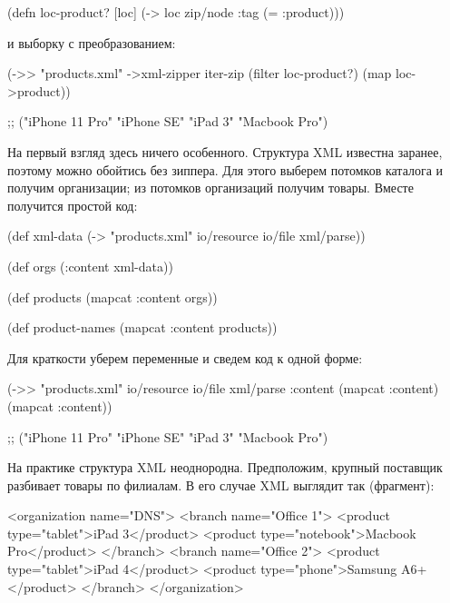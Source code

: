 \begin{english}
  \begin{clojure}
(defn loc-product? [loc]
  (-> loc zip/node :tag (= :product)))
  \end{clojure}
\end{english}

и выборку с преобразованием:

\begin{english}
  \begin{clojure}
(->> "products.xml"
     ->xml-zipper
     iter-zip
     (filter loc-product?)
     (map loc->product))

;; ("iPhone 11 Pro" "iPhone SE" "iPad 3" "Macbook Pro")
  \end{clojure}
\end{english}

На первый взгляд здесь ничего особенного. Структура XML известна заранее,
поэтому можно обойтись без зиппера. Для этого выберем потомков каталога и
получим организации; из потомков организаций получим товары. Вместе получится
простой код:

\begin{english}
  \begin{clojure}
(def xml-data
  (-> "products.xml"
      io/resource
      io/file
      xml/parse))

(def orgs
  (:content xml-data))

(def products
  (mapcat :content orgs))

(def product-names
  (mapcat :content products))
  \end{clojure}
\end{english}

Для краткости уберем переменные и сведем код к одной форме:

\begin{english}
  \begin{clojure}
(->> "products.xml"
     io/resource
     io/file
     xml/parse
     :content
     (mapcat :content)
     (mapcat :content))

;; ("iPhone 11 Pro" "iPhone SE" "iPad 3" "Macbook Pro")
  \end{clojure}
\end{english}

На практике структура XML неоднородна. Предположим, крупный поставщик разбивает
товары по филиалам. В его случае XML выглядит так (фрагмент):

\begin{english}
  \begin{xml}
<organization name="DNS">
  <branch name="Office 1">
    <product type="tablet">iPad 3</product>
    <product type="notebook">Macbook Pro</product>
  </branch>
  <branch name="Office 2">
    <product type="tablet">iPad 4</product>
    <product type="phone">Samsung A6+</product>
  </branch>
</organization>
  \end{xml}
\end{english}

